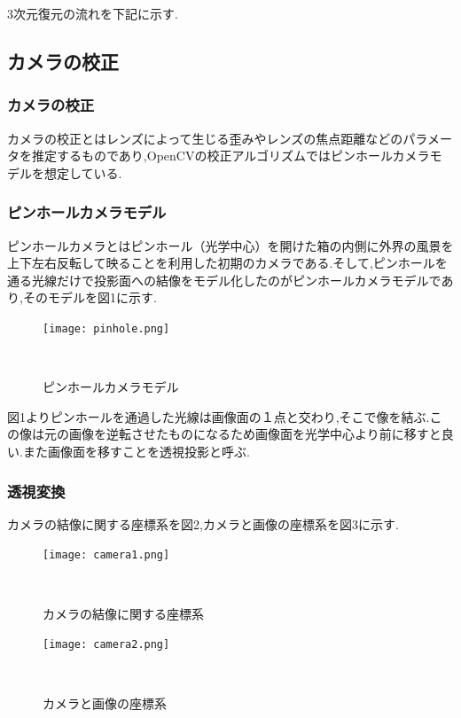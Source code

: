 \documentclass[11pt]{si2016}
\begin{document}
3次元復元の流れを下記に示す.

\subsection{カメラの校正}
\subsubsection{カメラの校正}
カメラの校正とはレンズによって生じる歪みやレンズの焦点距離などのパラメータを推定するものであり,OpenCVの校正アルゴリズムではピンホールカメラモデルを想定している.

\subsubsection{ピンホールカメラモデル}
ピンホールカメラとはピンホール（光学中心）を開けた箱の内側に外界の風景を上下左右反転して映ることを利用した初期のカメラである.そして,ピンホールを通る光線だけで投影面への結像をモデル化したのがピンホールカメラモデルであり,そのモデルを図1に示す.

\begin{figure}[b]
 \begin{center}
  \texttt{[image: pinhole.png]}
 　\caption{ピンホールカメラモデル}%
 　\label{fig:02}%
 \end{center}
\end{figure}

図1よりピンホールを通過した光線は画像面の１点と交わり,そこで像を結ぶ.この像は元の画像を逆転させたものになるため画像面を光学中心より前に移すと良い.また画像面を移すことを透視投影と呼ぶ.

\subsubsection{透視変換}
カメラの結像に関する座標系を図2,カメラと画像の座標系を図3に示す.

\begin{figure}[b]
 \begin{center}
  \texttt{[image: camera1.png]}
 　\caption{カメラの結像に関する座標系}%
 　\label{fig:02}%
 \end{center}
\end{figure}

\begin{figure}[b]
 \begin{center}
  \texttt{[image: camera2.png]}
 　\caption{カメラと画像の座標系}%
 　\label{fig:02}%
 \end{center}
\end{figure}
\end{document}
